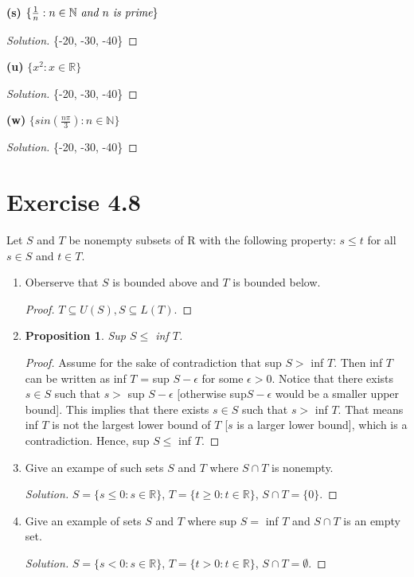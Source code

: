 \documentclass{article}
\newtheorem{proposition}[thm]{Proposition}
\begin{document}
\textbf{(s)} $\{\frac{1}{n}:n\in\mathbb{N} \emph{ and } n \emph{ is prime}\}$
\begin{proof}[Solution]
    \{-20, -30, -40\}
\end{proof}

\textbf{(u)} $\{x^2:x\in\mathbb{R}\}$
\begin{proof}[Solution]
    \{-20, -30, -40\}
\end{proof}

\textbf{(w)} $\{sin\left(\frac{n\pi}{3}\right):n\in\mathbb{N}\}$
\begin{proof}[Solution]
    \{-20, -30, -40\}
\end{proof}

\section*{Exercise 4.8}
Let $S$ and $T$ be nonempty subsets of R with the following property: $s\le t$ for all $s\in S$ and 
$t\in T$.
\begin{enumerate}[label=(\alph*)]
    \item Oberserve that $S$ is bounded above and $T$ is bounded below. 
    \begin{proof}
        $T\subseteq U(S), S\subseteq L(T)$.
    \end{proof}
    \item \begin{proposition}
        Sup $S\le$ inf $T$.
    \end{proposition}
    \begin{proof}
        Assume for the sake of contradiction that sup $S >$ inf $T$. Then inf $T$ can be written as 
        inf $T$ = sup $S - \epsilon$ for some $\epsilon > 0$. Notice that there exists $s\in S$ 
        such that $s >$ sup $S - \epsilon$ [otherwise sup$S -\epsilon$ would be a 
        smaller upper bound]. This implies that there exists $s\in S$ such that $s > $ inf $T$. That 
        means inf $T$ is not the largest lower bound of $T$ [$s$ is a larger lower bound], which is 
        a contradiction. Hence, sup $S\le$ inf $T$.
    \end{proof}
    \item Give an exampe of such sets $S$ and $T$ where $S\cap T$ is nonempty.
    \begin{proof}[Solution]
        $S = \{s \le 0 :s \in\mathbb{R}\}$, $T = \{t \ge 0 :t \in\mathbb{R}\}$, $S\cap T = \{0\}$.
    \end{proof}
    \item Give an example of sets $S$ and $T$ where sup $S=$ inf $T$ and $S\cap T$ is an empty set.
    \begin{proof}[Solution]
        $S = \{s < 0 :s \in\mathbb{R}\}$, $T = \{t > 0 :t \in\mathbb{R}\}$, $S\cap T = \emptyset$.
    \end{proof}
\end{enumerate}
\end{document}
